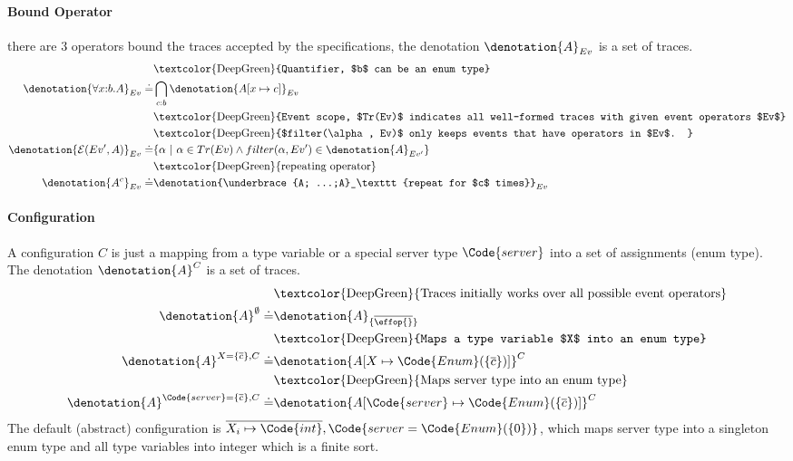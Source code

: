 \paragraph{Bound Operator} there are $3$ operators bound the traces accepted by the specifications, the denotation $\denotation{A}_{Ev}$ is a set of traces.
\begin{align*}
    &\text{\textcolor{DeepGreen}{Quantifier, $b$ can be an enum type}}
    \\\denotation{\forall x{:}b.A}_{Ev} \doteq& \bigcap_{c : b} \denotation{A[x \mapsto c]}_{Ev}
    \\&\text{\textcolor{DeepGreen}{Event scope, $Tr(Ev)$ indicates all well-formed traces with given event operators $Ev$}}
    \\&\text{\textcolor{DeepGreen}{$filter(\alpha, Ev)$ only keeps events that have operators in $Ev$. }}
    \\\denotation{\mathcal{E}(Ev', A)}_{Ev} \doteq& \{\alpha ~|~ \alpha \in Tr(Ev) \land filter(\alpha, Ev') \in \denotation{A}_{Ev'} \}
    \\&\text{\textcolor{DeepGreen}{repeating operator}}
    \\\denotation{A^c}_{Ev} \doteq& \denotation{\underbrace{A; ...;A}_\texttt{repeat for $c$ times}}_{Ev}
\end{align*}

\paragraph{Configuration} A configuration $C$ is just a mapping from a type variable or a special server type $\Code{server}$ into a set of assignments (enum type). The denotation $\denotation{A}^C$ is a set of traces.
\begin{align*}
     &\text{\textcolor{DeepGreen}{Traces initially works over all possible event operators}}
    \\\denotation{A}^{\emptyset} \doteq& \denotation{A}_{\{\overline{\effop{}}\}}
    \\&\text{\textcolor{DeepGreen}{Maps a type variable $X$ into an enum type}}
    \\\denotation{A}^{X = \{\overline{c}\}, C} \doteq& \denotation{A[X \mapsto \Code{Enum}( \{\overline{c}\})]}^C
    \\&\text{\textcolor{DeepGreen}{Maps server type into an enum type}}
     \\\denotation{A}^{\Code{server} = \{\overline{c}\}, C} \doteq& \denotation{A[\Code{server} \mapsto \Code{Enum}( \{\overline{c}\})]}^C
\end{align*}\noindent
The default (abstract) configuration is $\overline{X_i \mapsto \Code{int}}, \Code{server = \Code{Enum}(\{0\})}$, which maps server type into a singleton enum type and all type variables into integer which is a finite sort.


